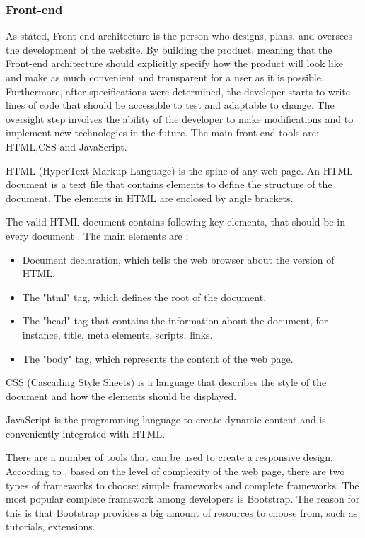 \documentclass[a4paper]{article}
\begin{document}
    \subsubsection{Front-end}
    As \cite{godbolt2016frontend} stated, Front-end architecture is the person who designs, plans, and oversees the development of the website. By building the product, meaning that the Front-end architecture should explicitly specify how the product will look like and make as much convenient and transparent for a user as it is possible. Furthermore, after specifications were determined, the developer starts to write lines of code that should be accessible to test and adaptable to change. The oversight step involves the ability of the developer to make modifications and to implement new technologies in the future.
    The main front-end tools are: HTML,CSS and JavaScript.
    
    HTML (HyperText Markup Language) is the spine of any web page. An HTML document is a text file that contains elements to define the structure of the document. The elements in HTML are enclosed by angle brackets.
    
    The valid HTML document contains following key elements, that should be in every document \cite{henick2010html}. The main elements are :
    \begin{itemize}
        \item Document declaration, which tells the web browser about the version of HTML.
        \item The "html" tag, which defines the root of the document. 
        \item The "head" tag that contains the information about the document, for instance, title, meta elements, scripts, links.
        \item The "body" tag, which represents the content of the web page.
    \end{itemize}
    
    CSS (Cascading Style Sheets) is a language that describes the style of the document and how the elements should be displayed.
    
    JavaScript is the programming language to create dynamic content and is conveniently integrated with HTML.
    
    There are a number of tools that can be used to create a responsive design. According to \cite{jain2015review}, based on the level of complexity of the web page, there are two types of frameworks to choose: simple frameworks and complete frameworks. The most popular complete framework among developers is Bootstrap. The reason for this is that Bootstrap provides a big amount of resources to choose from, such as tutorials, extensions. 
    
\end{document}
